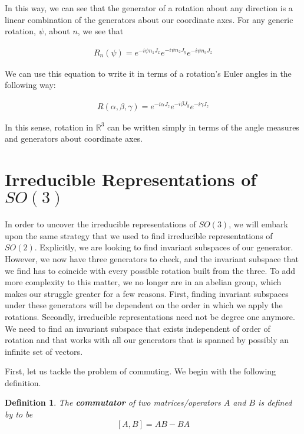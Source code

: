 \documentclass[10pt]{ucthesis}
\newcommand{\R}{\mathbb{R}}
\newtheorem{definition}{Definition}[chapter]
\begin{document}
In this way, we can see that the generator of a rotation about any direction is a linear combination of the generators about our coordinate axes. For any generic rotation, $\psi$, about $n$, we see that 

\begin{equation}
	\begin{aligned}
		R_n(\psi) = e^{-i\psi n_1J_x}e^{-i\psi n_2J_y}e^{-i\psi n_3J_z}
	\end{aligned}
\end{equation} 

We can use this equation to write it in terms of a rotation's Euler angles in the following way:

\begin{equation}
	\begin{aligned}
		R(\alpha,\beta,\gamma) = e^{-i\alpha J_z}e^{-i\beta J_y}e^{-i\gamma J_z}
	\end{aligned}
\end{equation} 

In this sense, rotation in $\R^3$ can be written simply in terms of the angle measures and generators about coordinate axes.

\section{Irreducible Representations of $SO(3)$}

In order to uncover the irreducible representations of $SO(3)$, we will embark upon the same strategy that we used to find irreducible representations of $SO(2)$. Explicitly, we are looking to find invariant subspaces of our generator. However, we now have three generators to check, and the invariant subspace that we find has to coincide with every possible rotation built from the three. To add more complexity to this matter, we no longer are in an abelian group, which makes our struggle greater for a few reasons. First, finding invariant subspaces under these generators will be dependent on the order in which we apply the rotations. Secondly, irreducible representations need not be degree one anymore. We need to find an invariant subspace that exists independent of order of rotation and that works with all our generators that is spanned by possibly an infinite set of vectors.

First, let us tackle the problem of commuting. We begin with the following definition.

\begin{definition}
	The \textbf{commutator} of two matrices/operators $A$ and $B$ is defined by to be 
$$[A,B]=AB-BA$$
\end{definition}
\end{document}
